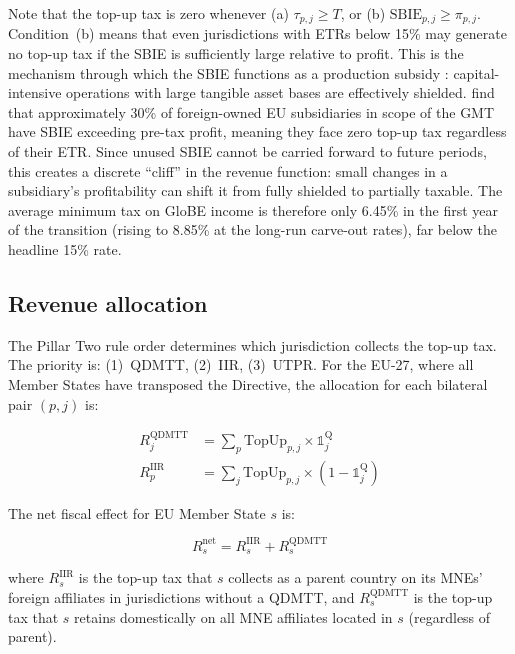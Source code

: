 \documentclass[11pt,a4paper]{article}
\begin{document}
Note that the top-up tax is zero whenever (a) $\tau_{p,j} \geq T$, or (b) $\text{SBIE}_{p,j} \geq \pi_{p,j}$. Condition~(b) means that even jurisdictions with ETRs below 15\% may generate no top-up tax if the SBIE is sufficiently large relative to profit. This is the mechanism through which the SBIE functions as a production subsidy \citep{schjelderup2024}: capital-intensive operations with large tangible asset bases are effectively shielded. \citet{devereux2023} find that approximately 30\% of foreign-owned EU subsidiaries in scope of the GMT have SBIE exceeding pre-tax profit, meaning they face zero top-up tax regardless of their ETR. Since unused SBIE cannot be carried forward to future periods, this creates a discrete ``cliff'' in the revenue function: small changes in a subsidiary's profitability can shift it from fully shielded to partially taxable. The average minimum tax on GloBE income is therefore only 6.45\% in the first year of the transition (rising to 8.85\% at the long-run carve-out rates), far below the headline 15\% rate.

\subsection{Revenue allocation}\label{sec:allocation}

The Pillar Two rule order determines which jurisdiction collects the top-up tax. The priority is: (1)~QDMTT, (2)~IIR, (3)~UTPR. For the EU-27, where all Member States have transposed the Directive, the allocation for each bilateral pair $(p, j)$ is:

\begin{align}
R_j^{\text{QDMTT}} &= \sum_p \text{TopUp}_{p,j} \times \mathbb{1}_j^{\text{Q}} \label{eq:qdmtt} \\
R_p^{\text{IIR}} &= \sum_j \text{TopUp}_{p,j} \times (1 - \mathbb{1}_j^{\text{Q}}) \label{eq:iir}
\end{align}

The net fiscal effect for EU Member State $s$ is:

\begin{equation}\label{eq:net}
R_s^{\text{net}} = R_s^{\text{IIR}} + R_s^{\text{QDMTT}}
\end{equation}

where $R_s^{\text{IIR}}$ is the top-up tax that $s$ collects as a parent country on its MNEs' foreign affiliates in jurisdictions without a QDMTT, and $R_s^{\text{QDMTT}}$ is the top-up tax that $s$ retains domestically on all MNE affiliates located in $s$ (regardless of parent).
\end{document}
